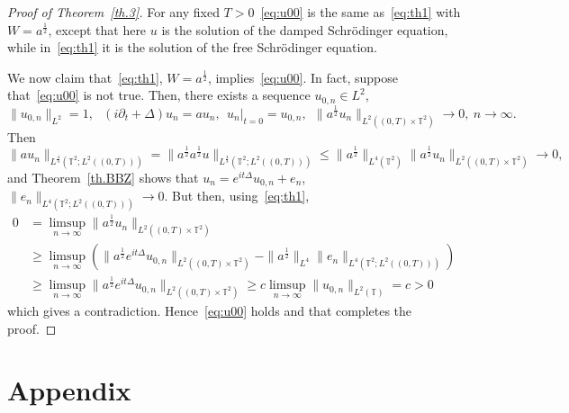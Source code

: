 \documentclass[AHL, Unicode, longabstracts]{cedram}
\newcommand{\TT}{{\mathbb T}}
\newcommand{\TT}{{\mathbb T}}
\begin{document}
\begin{proof}[Proof of Theorem~\ref{th.3}]
For any fixed $T>0$~\eqref{eq:u00} is the same as~\eqref{eq:th1} with $ W = a^{\frac12} $, except that here $u$ is the solution of the damped Schrödinger equation, while in~\eqref{eq:th1} it is the solution of the free Schrödinger equation.

We now claim that~\eqref{eq:th1}, $ W = a^{\frac12} $, implies~\eqref{eq:u00}. In fact, suppose that~\eqref{eq:u00} is not true. Then, there exists a sequence $ u_{0,n} \in L^2 $,
\[
\| u_{0,n} \|_{L^2} =1, \ \ \ (i \partial_t + \Delta)u_n = a u_n, \ \ u_n|_{t=0} = u_{0,n}, \ \
\| a^{\frac12} u_n \|_{ L^2 ((0, T) \times \TT^2) } \to 0, \ n\to \infty.
\]
Then
\[
\| a u_n \|_{ L^{\frac43} (\TT^2; L^2 ((0, T))) } =
\| a^{\frac12} a^{\frac12} u \|_{ L^{\frac43} (\TT^2; L^2 ((0, T))) }
\leq \| a^{\frac12} \|_{L^4(\TT^2) }
\| a^{\frac12} u_n \|_{ L^2 ((0, T) \times \TT^2) } \to 0,
\]
and Theorem~\ref{th.BBZ} shows that $ u_n = e^{ it \Delta} u_{0,n} + e_n$, $ \| e_n \|_{ L^4 (\TT^2 ; L^2 ((0, T))) } \to 0 $. But then, using~\eqref{eq:th1},
\[
\begin{split} 0 & = \limsup_{n \to \infty } \| a^{\frac12} u_n \|_{L^2 ((0, T) \times \TT^2) }
\\ &
\geq \limsup_{n \to \infty } \left(\| a^{\frac12} e^{ it \Delta } u_{ 0,n} \|_{ L^2 ((0, T) \times \TT^2) } - \| a^{\frac12} \|_{L^4 }
\| e_n \|_{ L^4 (\TT^2 ; L^2 ((0, T))) } \right) \\
& \geq
\limsup_{n \to \infty } \| a^{\frac12} e^{ it \Delta } u_{ 0,n} \|_{ L^2 ((0, T) \times \TT^2) } \geq c
\limsup_{n\to \infty } \| u_{0,n}\|_{L^2 (\TT)} = c > 0
\end{split}
\]
which gives a contradiction. Hence~\eqref{eq:u00} holds and that completes the proof.
\end{proof}

\appendix
\section*{Appendix}
\end{document}
